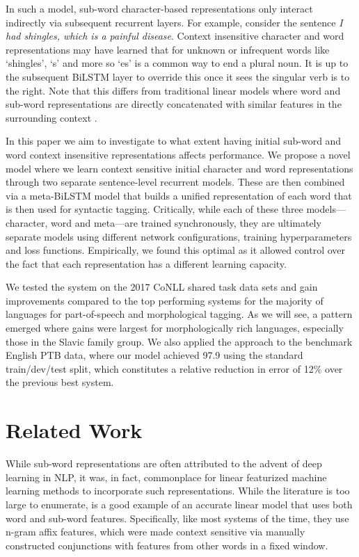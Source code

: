 \documentclass[11pt,a4paper]{article}
\begin{document}
In such a model, sub-word character-based representations only interact indirectly via subsequent recurrent layers. For example, consider the sentence \emph{I had shingles, which is a painful disease}. 
Context insensitive character and word representations may have learned that for unknown or infrequent words like `shingles', `s' and more so `es' is a common way to end a plural noun. It is up to the subsequent BiLSTM layer to override this once it sees the singular verb is to the right. Note that this differs from traditional linear models where word and sub-word representations are directly concatenated with similar features in the surrounding context \cite{gimenez2004}.

In this paper we aim to investigate to what extent having initial sub-word and word context insensitive representations affects performance. We propose a novel model where we learn context sensitive initial character and word representations through two separate sentence-level recurrent models. These are then combined via a meta-BiLSTM model that builds a unified representation of each word that is then used for syntactic tagging. Critically, while each of these three models---character, word and meta---are trained synchronously, they are ultimately separate models using different network configurations, training hyperparameters and loss functions. Empirically, we found this optimal as it allowed control over the fact that each representation has a different learning capacity. 



We tested the system on the 2017 CoNLL shared task data sets and gain improvements compared to the top performing systems for the majority of languages for part-of-speech and morphological tagging. As we will see, a pattern emerged where gains were largest for morphologically rich languages, especially those in the Slavic family group.
We also applied the approach to the benchmark English PTB data, where our model achieved 97.9 using the standard train/dev/test split, which constitutes a relative reduction in error of 12\% over the previous best system. 


\section{Related Work}

While sub-word representations are often attributed to the advent of deep learning in NLP, it was, in fact, commonplace for linear featurized machine learning methods to incorporate such representations. While the literature is too large to enumerate, 
 is a good example of an accurate linear model that uses both word and sub-word features. Specifically, like most systems of the time, they use n-gram affix features, which were made context sensitive via manually constructed conjunctions with features from other words in a fixed window.
\end{document}
